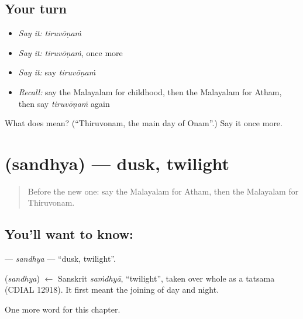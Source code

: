\subsection*{Your turn}
\begin{itemize}
\raggedright
  \item \emph{Say it:} \emph{tiruvōṇaṁ}
  \item \emph{Say it:} \emph{tiruvōṇaṁ}, once more
  \item \emph{Say it:} say \emph{tiruvōṇaṁ}
  \item \emph{Recall:} say the Malayalam for childhood, then the Malayalam for Atham, then say \emph{tiruvōṇaṁ} again
\end{itemize}

\begin{tcolorbox}[breakable,colback=teal!4,colframe=teal!35!black,title={Before you move on}]
What does  mean? (\textquotedblleft{}Thiruvonam, the main day of Onam\textquotedblright{}.) Say it once more.
\end{tcolorbox}
\section[\texorpdfstring{\ml{സന്ധ്യ} (sandhya)}{സന്ധ്യ (sandhya)}]{ (sandhya) — dusk, twilight}

\label{lesson:ML-C236-sandhya}



\begin{quote}
Before the new one: say the Malayalam for Atham, then the Malayalam for Thiruvonam.
\end{quote}

\subsection*{You'll want to know: }
\textbf{} — \emph{sandhya} — \textquotedblleft{}dusk, twilight\textquotedblright{}.

\begin{cousinweb}
\textbf{} (\emph{sandhya}) $\leftarrow$ Sanskrit \emph{saṁdhyā}, \textquotedblleft{}twilight\textquotedblright{}, taken over whole as a tatsama (CDIAL 12918). It first meant the joining of day and night.
\end{cousinweb}

\begin{grammarlens}[title={What you've built}]
One more word for this chapter.
\end{grammarlens}

